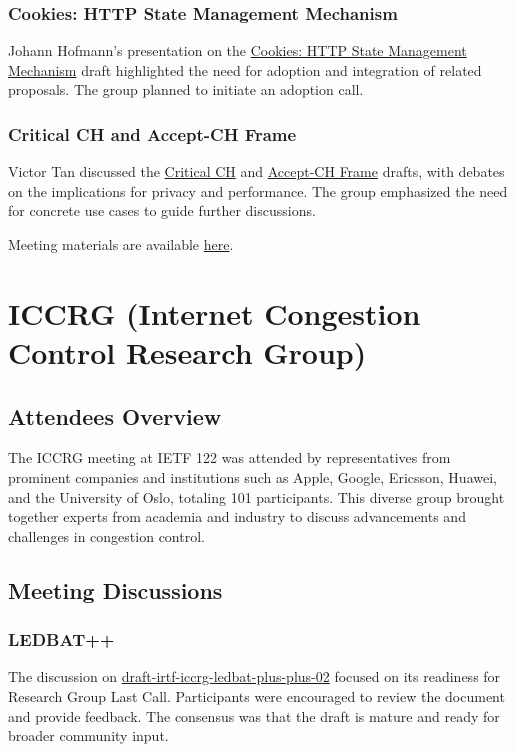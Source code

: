 \documentclass{article}
\begin{document}
\subsubsection{Cookies: HTTP State Management Mechanism}
Johann Hofmann's presentation on the \href{https://datatracker.ietf.org/doc/html/draft-annevk-johannhof-httpbis-cookies}{Cookies: HTTP State Management Mechanism} draft highlighted the need for adoption and integration of related proposals. The group planned to initiate an adoption call.

\subsubsection{Critical CH and Accept-CH Frame}
Victor Tan discussed the \href{https://datatracker.ietf.org/doc/html/draft-victortan-httpbis-chr-critical-ch}{Critical CH} and \href{https://datatracker.ietf.org/doc/html/draft-victortan-httpbis-chr-accept-ch-frame}{Accept-CH Frame} drafts, with debates on the implications for privacy and performance. The group emphasized the need for concrete use cases to guide further discussions.

Meeting materials are available \href{https://notes.ietf.org/notes-ietf-122-httpbis}{here}.



\newpage

\section{ICCRG (Internet Congestion Control Research Group)}

\subsection{Attendees Overview}
The ICCRG meeting at IETF 122 was attended by representatives from prominent companies and institutions such as Apple, Google, Ericsson, Huawei, and the University of Oslo, totaling 101 participants. This diverse group brought together experts from academia and industry to discuss advancements and challenges in congestion control.

\subsection{Meeting Discussions}

\subsubsection{LEDBAT++}
The discussion on \href{https://datatracker.ietf.org/doc/html/draft-irtf-iccrg-ledbat-plus-plus-02}{draft-irtf-iccrg-ledbat-plus-plus-02} focused on its readiness for Research Group Last Call. Participants were encouraged to review the document and provide feedback. The consensus was that the draft is mature and ready for broader community input.
\end{document}
